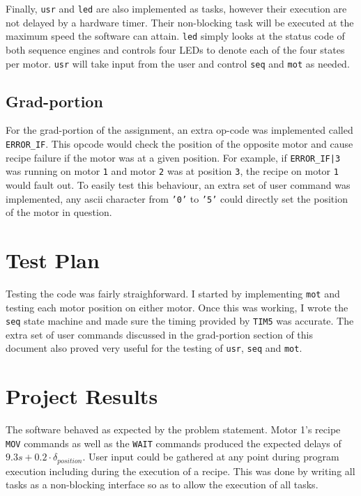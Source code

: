 \documentclass[CMPE]{KGCOEReport}
\def\code#1{\texttt{#1}}
\begin{document}
	Finally, \code{usr} and \code{led} are also implemented as tasks, however
	their execution are not delayed by a hardware timer. Their non-blocking
	task will be executed at the maximum speed the software can attain. \code{led}
	simply looks at the status code of both sequence engines and controls four
	LEDs to denote each of the four states per motor. \code{usr} will take input
	from the user and control \code{seq} and \code{mot} as needed.

	\subsection*{Grad-portion}

	For the grad-portion of the assignment, an extra op-code was implemented
	called \code{ERROR\_IF}. This opcode would check the position of the opposite
	motor and cause recipe failure if the motor was at a given position. For
	example, if \code{ERROR\_IF|3} was running on motor \code{1} and motor
	\code{2} was at position \code{3}, the recipe on motor \code{1} would fault
	out. To easily test this behaviour, an extra set of user command was
	implemented, any ascii character from \code{'0'} to \code{'5'} could directly
	set the position of the motor in question.

    \section*{Test Plan}

    Testing the code was fairly straighforward. I started by implementing
   	\code{mot} and testing each motor position on either motor. Once this
   	was working, I wrote the \code{seq} state machine and made sure the timing
   	provided by \code{TIM5} was accurate. The extra set of user commands
   	discussed in the grad-portion section of this document also proved very
   	useful for the testing of \code{usr}, \code{seq} and \code{mot}.

    \section*{Project Results}

    The software behaved as expected by the problem statement. Motor 1's
    recipe \code{MOV} commands as well as the \code{WAIT} commands produced
    the expected delays of $9.3s + 0.2 \cdot \delta_{position}$. User input
    could be gathered at any point during program execution including during
    the execution of a recipe. This was done by writing all tasks as a
    non-blocking interface so as to allow the execution of all tasks.
\end{document}
